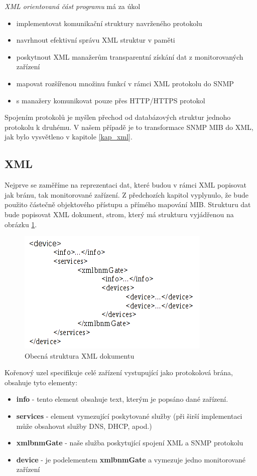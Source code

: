 \textit{XML orientovaná část programu } má za úkol
\begin{itemize}
	\item implementovat komunikační struktury navrženého protokolu
	\item navrhnout efektivní správu XML struktur v paměti
	\item poskytnout XML manažerům transparentní získání dat z monitorovaných zařízení
	\item mapovat rozšířenou množinu funkcí v rámci XML protokolu do SNMP
	\item s manažery komunikovat pouze přes HTTP/HTTPS protokol
\end{itemize}
Spojením protokolů je myšlen přechod od databázových struktur jednoho protokolu k druhému. V našem případě je to transformace SNMP MIB do XML, jak bylo vysvětleno v kapitole \ref{kap_xml}.

\subsection{XML}
Nejprve se zaměříme na reprezentaci dat, které budou v rámci XML popisovat jak bránu, tak monitorované zařízení. Z předchozích kapitol vyplynulo, že bude použito částečně objektového přístupu a přímého mapování MIB.
Strukturu dat bude popisovat XML dokument, strom, který má strukturu vyjádřenou na obrázku \ref{obr_an_strom_struktura}.

\begin{figure}[htp]
	\begin{center}
		\includegraphics{obrazky/04_schema_dokumentu.png}
		\caption{Obecná struktura XML dokumentu}
		\label{obr_an_strom_struktura}
	\end{center}
\end{figure}

Kořenový uzel specifikuje celé zařízení vystupující jako protokolová brána, obsahuje tyto elementy:
\begin{itemize}
	\item \textbf{info} - tento element obsahuje text, kterým je popsáno dané zařízení.
	\item \textbf{services} - element vymezující poskytované služby (při širší implementaci může obsahovat služby DNS, DHCP, apod.)
	\item \textbf{xmlbnmGate} - naše služba poskytující spojení XML a SNMP protokolu
	\item \textbf{device} - je podelementem \textbf{xmlbnmGate} a vymezuje jedno monitorované zařízení
\end{itemize}

